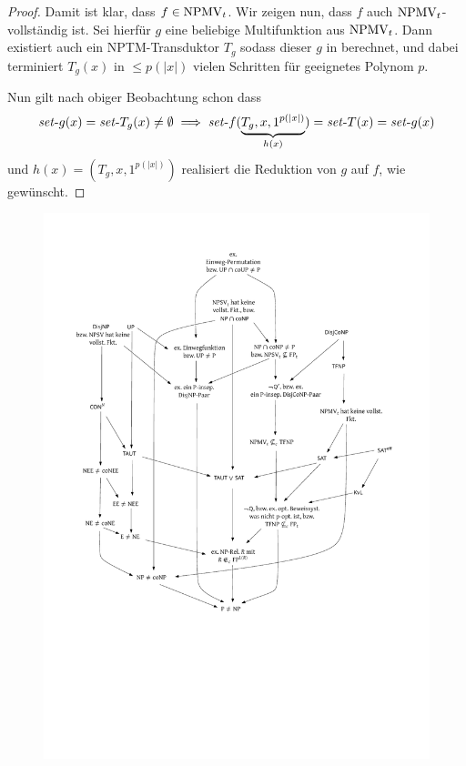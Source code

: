 \begin{proof}
    Damit ist klar, dass $f\in\mathrm{NPMV}_t$.
    Wir zeigen nun, dass $f$ auch $\mathrm{NPMV}_t$-vollständig ist.
    Sei hierfür $g$ eine beliebige Multifunktion aus $\mathrm{NPMV}_t$.
    Dann existiert auch ein NPTM-Transduktor $T_g$ sodass dieser $g$ in berechnet, und dabei terminiert $T_g(x)$ in $\leq p(|x|)$ vielen Schritten für geeignetes Polynom $p$.

    Nun gilt nach obiger Beobachtung schon dass 
    \[ \mathit{set}\text{-}{g}(x) = \mathit{set}\text{-}{T_g}(x)\neq\emptyset \implies \mathit{set}\text{-}{f}(\underbrace{T_g, x, 1^{p(|x|)}}_{h(x)})=\mathit{set}\text{-}{T}(x)=\mathit{set}\text{-}{g}(x) \]
    und $h(x)=(T_g, x, 1^{p(|x|)})$ realisiert die Reduktion von $g$ auf $f$, wie gewünscht.
\end{proof}

\begin{figure}[p]
    \hspace*{-.2cm}\includegraphics[page=7]{figures.pdf}
    \vspace*{-5.8cm}

\end{figure}
